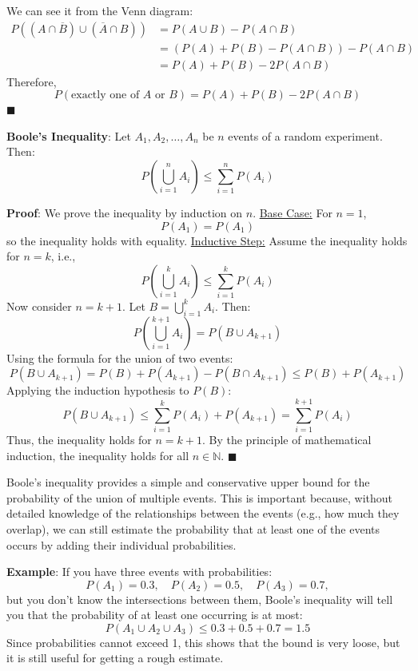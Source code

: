 \documentclass[twoside]{book}
\begin{document}
We can see it from the Venn diagram:
\begin{align*}
    P((A \cap \overline{B}) \cup (\overline{A} \cap B)) &= P(A \cup B) - P(A \cap B) \\
    &= (P(A) + P(B) - P(A \cap B)) - P(A \cap B) \\
    &= P(A) + P(B) - 2P(A \cap B)
\end{align*}
Therefore,
\[
P(\text{exactly one of } A \text{ or } B) = P(A) + P(B) - 2P(A \cap B)
\]
\hfill\(\blacksquare\)

\begin{textbox}
\textbf{Boole's Inequality}: Let \( A_1, A_2, \ldots, A_n \) be $n$ events of a random experiment. Then:
\[
P\left( \bigcup_{i=1}^{n} A_i \right) \leq \sum_{i=1}^{n} P(A_i)
\]
\end{textbox}
\textbf{Proof}: We prove the inequality by induction on \( n \).
\underline{Base Case:} For \( n = 1 \),
\[
P(A_1) = P(A_1)
\]
so the inequality holds with equality.
\underline{Inductive Step:} Assume the inequality holds for \( n = k \), i.e.,
\[
P\left( \bigcup_{i=1}^{k} A_i \right) \leq \sum_{i=1}^{k} P(A_i)
\]
Now consider \( n = k+1 \). Let \( B = \bigcup_{i=1}^{k} A_i \). Then:
\[
P\left( \bigcup_{i=1}^{k+1} A_i \right) = P(B \cup A_{k+1})
\]
Using the formula for the union of two events:
\[
P(B \cup A_{k+1}) = P(B) + P(A_{k+1}) - P(B \cap A_{k+1}) \leq P(B) + P(A_{k+1})
\]
Applying the induction hypothesis to \( P(B) \):
\[
P(B \cup A_{k+1}) \leq \sum_{i=1}^{k} P(A_i) + P(A_{k+1}) = \sum_{i=1}^{k+1} P(A_i)
\]
Thus, the inequality holds for \( n = k+1 \). By the principle of mathematical induction, the inequality holds for all \( n \in \mathbb{N} \).
\hfill\(\blacksquare\)

Boole's inequality provides a simple and conservative upper bound for the probability of the union of multiple events. This is important because, without detailed knowledge of the relationships between the events (e.g., how much they overlap), we can still estimate the probability that at least one of the events occurs by adding their individual probabilities.

\textbf{Example}: If you have three events with probabilities:
\[
P(A_1) = 0.3, \quad P(A_2) = 0.5, \quad P(A_3) = 0.7,
\]
but you don’t know the intersections between them, Boole’s inequality will tell you that the probability of at least one occurring is at most:
\[
P(A_1 \cup A_2 \cup A_3) \leq 0.3 + 0.5 + 0.7 = 1.5
\]
Since probabilities cannot exceed 1, this shows that the bound is very loose, but it is still useful for getting a rough estimate.
\end{document}
